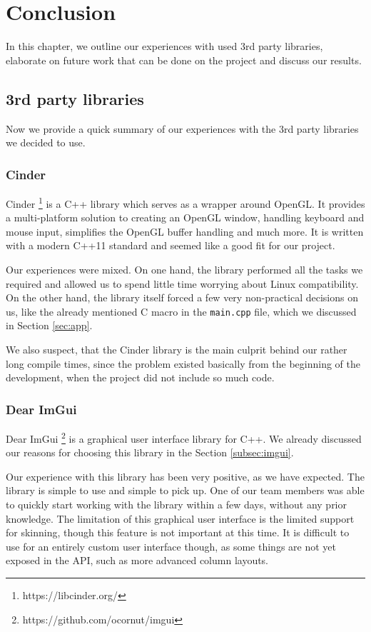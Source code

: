 \chapter{Conclusion}

In this chapter, we outline our experiences with used 3rd party libraries, elaborate on future work that can be done on the project and discuss our results.

\section{3rd party libraries}

Now we provide a quick summary of our experiences with the 3rd party libraries we decided to use.

\subsection{Cinder}

Cinder \footnote{https://libcinder.org/} is a C++ library which serves as a wrapper around OpenGL. It provides a multi-platform solution to creating an OpenGL window, handling keyboard and mouse input, simplifies the OpenGL buffer handling and much more. It is written with a modern C++11 standard and seemed like a good fit for our project.

Our experiences were mixed. On one hand, the library performed all the tasks we required and allowed us to spend little time worrying about Linux compatibility. On the other hand, the library itself forced a few very non-practical decisions on us, like the already mentioned C macro in the \texttt{main.cpp} file, which we discussed in Section \ref{sec:app}.

We also suspect, that the Cinder library is the main culprit behind our rather long compile times, since the problem existed basically from the beginning of the development, when the project did not include so much code.

\subsection{Dear ImGui}

Dear ImGui \footnote{https://github.com/ocornut/imgui} is a graphical user interface library for C++. We already discussed our reasons for choosing this library in the Section \ref{subsec:imgui}.

Our experience with this library has been very positive, as we have expected. The library is simple to use and simple to pick up. One of our team members was able to quickly start working with the library within a few days, without any prior knowledge. The limitation of this graphical user interface is the limited support for skinning, though this feature is not important at this time. It is difficult to use for an entirely custom user interface though, as some things are not yet exposed in the API, such as more advanced column layouts.

